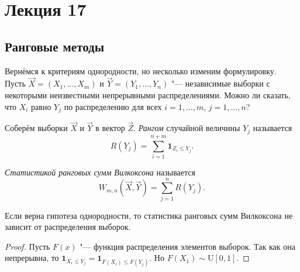
\section{Лекция 17}
\subsection{Ранговые методы}
Вернёмся к критериям однородности, но несколько изменим формулировку. Пусть $\vec{X} = (X_{1}, \ldots, X_{m})$ и $\vec{Y} = (Y_{1}, \ldots, Y_{n})$ "--- независимые выборки с некоторыми неизвестными непрерывными распределениями. Можно ли сказать, что $X_{i}$ равно $Y_{j}$ по распределению для всех $i = 1, \ldots, m$, $j = 1, \ldots, n$?

\begin{definition}
	Соберём выборки $\vec{X}$ и $\vec{Y}$ в вектор $\vec{Z}$. \emph{Рангом} случайной величины $Y_{j}$ называется
	\begin{equation}
		R(Y_{j}) = \sum_{i = 1}^{n + m} \mathbf{1}_{Z_{i} \leq Y_{j}}.
	\end{equation}
\end{definition}
\begin{definition}
	\emph{Статистикой ранговых сумм Вилкоксона} называется 
	\begin{equation}
		W_{m, n}(\vec{X}, \vec{Y}) = \sum_{j = 1}^{n} R(Y_{j}).
	\end{equation}
\end{definition}
\begin{statement}
	Если верна гипотеза однородности, то статистика ранговых сумм Вилкоксона не зависит от распределения выборок.
\end{statement}
\begin{proof}
	Пусть $F(x)$ "--- функция распределения элементов выборок. Так как она непрерывна, то $\mathbf{1}_{X_{i} \leq Y_{j}} = \mathbf{1}_{F(X_{i}) \leq F(Y_{j})}$. Но $F(X_{1}) \sim \mathrm{U}[0, 1]$.
\end{proof}